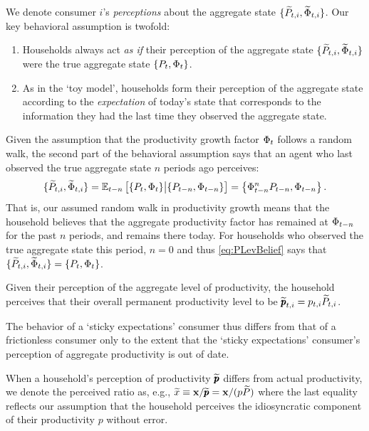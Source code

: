 \documentclass[titlepage]{./econtex}
\begin{document}
We denote consumer $i$'s \textit{perceptions} about the aggregate state $\{\widetilde{P}_{t,i},\widetilde{\Phi}_{t,i}\}$.  Our key behavioral assumption is twofold:
\begin{enumerate}
\item Households always act \textit{as if} their perception of the aggregate state $\{\widetilde{P}_{t,i},\widetilde{\Phi}_{t,i}\}$ were the true aggregate state $\{P_t,\Phi_t\}$.

\item As in the `toy model', households form their perception of the aggregate state according to the \textit{expectation} of today's state that corresponds to the information they had the last time they observed the aggregate state.
\end{enumerate}
Given the assumption that the productivity growth factor $\Phi_t$ follows a random walk,
the second part of the behavioral assumption says that an agent who last observed the true
aggregate state $n$ periods ago perceives:
\begin{equation}\label{eq:PLevBelief}
\{\widetilde{P}_{t,i},\widetilde{\Phi}_{t,i}\} = \operatorname{\mathbb{E}}_{t-n}\big[\{P_t,\Phi_t\} \big| \{P_{t-n},\Phi_{t-n}\}\big] = \left\{\Phi_{t-n}^{n} P_{t-n},\Phi_{t-n}\right\}.
\end{equation}
That is, our assumed random walk in productivity growth means that the household believes that the aggregate productivity factor has remained at $\Phi_{t-n}$ for the past $n$ periods, and remains there today. For households who observed the true aggregate state this period, $n=0$ and thus \eqref{eq:PLevBelief} says that $\{\widetilde{P}_{t,i},\widetilde{\Phi}_{t,i}\} = \{P_t,\Phi_t\}$.

Given their perception of the aggregate level of productivity, the household perceives that their overall permanent productivity level to be $\widetilde{\pmb{p}}_{t,i} = p_{t,i} \widetilde{P}_{t,i}$.

The behavior of a `sticky expectations' consumer thus differs from that of a frictionless consumer only to the extent that the `sticky expectations' consumer's perception of aggregate productivity is out of date.

When a household's perception of productivity $\widetilde{\pmb{p}}$ differs from actual productivity, we denote the perceived ratio as, e.g., $\widetilde{x} \equiv \mathbf{x}/\widetilde{\pmb{p}} = \mathbf{x}/({p}\widetilde{P})$ where the last equality reflects our assumption that the household perceives the idiosyncratic component of their productivity ${p}$ without error.
\end{document}

